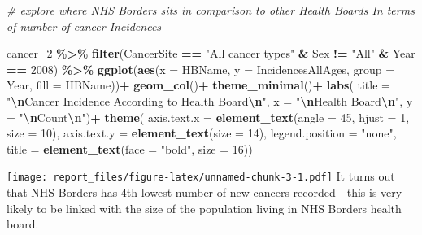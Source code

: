 \documentclass[
]{article}
\newenvironment{Shaded}{\begin{snugshade}}{\end{snugshade}}
\newcommand{\AttributeTok}[1]{\textcolor[rgb]{0.13,0.29,0.53}{#1}}
\newcommand{\CommentTok}[1]{\textcolor[rgb]{0.56,0.35,0.01}{\textit{#1}}}
\newcommand{\DecValTok}[1]{\textcolor[rgb]{0.00,0.00,0.81}{#1}}
\newcommand{\FunctionTok}[1]{\textcolor[rgb]{0.13,0.29,0.53}{\textbf{#1}}}
\newcommand{\NormalTok}[1]{#1}
\newcommand{\SpecialCharTok}[1]{\textcolor[rgb]{0.81,0.36,0.00}{\textbf{#1}}}
\newcommand{\StringTok}[1]{\textcolor[rgb]{0.31,0.60,0.02}{#1}}
\begin{document}
\begin{Shaded}
\begin{Highlighting}[]
 \CommentTok{\# explore where NHS Borders sits in comparison to other Health Boards In terms of number of cancer Incidences}

\NormalTok{cancer\_2 }\SpecialCharTok{\%\textgreater{}\%} 
  \FunctionTok{filter}\NormalTok{(CancerSite }\SpecialCharTok{==} \StringTok{"All cancer types"} \SpecialCharTok{\&}\NormalTok{ Sex }\SpecialCharTok{!=} \StringTok{"All"} \SpecialCharTok{\&}\NormalTok{ Year }\SpecialCharTok{==} \DecValTok{2008}\NormalTok{) }\SpecialCharTok{\%\textgreater{}\%} 
  \FunctionTok{ggplot}\NormalTok{(}\FunctionTok{aes}\NormalTok{(}\AttributeTok{x =}\NormalTok{ HBName, }\AttributeTok{y =}\NormalTok{ IncidencesAllAges, }\AttributeTok{group =}\NormalTok{ Year, }\AttributeTok{fill =}\NormalTok{ HBName))}\SpecialCharTok{+}
  \FunctionTok{geom\_col}\NormalTok{()}\SpecialCharTok{+}
  \FunctionTok{theme\_minimal}\NormalTok{()}\SpecialCharTok{+}
  \FunctionTok{labs}\NormalTok{(}
    \AttributeTok{title =} \StringTok{"}\SpecialCharTok{\textbackslash{}n}\StringTok{Cancer Incidence According to Health Board}\SpecialCharTok{\textbackslash{}n}\StringTok{"}\NormalTok{,}
    \AttributeTok{x =} \StringTok{"}\SpecialCharTok{\textbackslash{}n}\StringTok{Health Board}\SpecialCharTok{\textbackslash{}n}\StringTok{"}\NormalTok{, }
    \AttributeTok{y =} \StringTok{"}\SpecialCharTok{\textbackslash{}n}\StringTok{Count}\SpecialCharTok{\textbackslash{}n}\StringTok{"}\NormalTok{)}\SpecialCharTok{+}
  \FunctionTok{theme}\NormalTok{(}
    \AttributeTok{axis.text.x =} \FunctionTok{element\_text}\NormalTok{(}\AttributeTok{angle =} \DecValTok{45}\NormalTok{, }\AttributeTok{hjust =} \DecValTok{1}\NormalTok{, }\AttributeTok{size =} \DecValTok{10}\NormalTok{),}
  \AttributeTok{axis.text.y =} \FunctionTok{element\_text}\NormalTok{(}\AttributeTok{size =} \DecValTok{14}\NormalTok{),}
    \AttributeTok{legend.position =} \StringTok{"none"}\NormalTok{,}
    \AttributeTok{title =} \FunctionTok{element\_text}\NormalTok{(}\AttributeTok{face =} \StringTok{"bold"}\NormalTok{, }\AttributeTok{size =} \DecValTok{16}\NormalTok{))}
\end{Highlighting}
\end{Shaded}

\texttt{[image: report\_files/figure-latex/unnamed-chunk-3-1.pdf]} It
turns out that NHS Borders has 4th lowest number of new cancers recorded
- this is very likely to be linked with the size of the population
living in NHS Borders health board.
\end{document}
